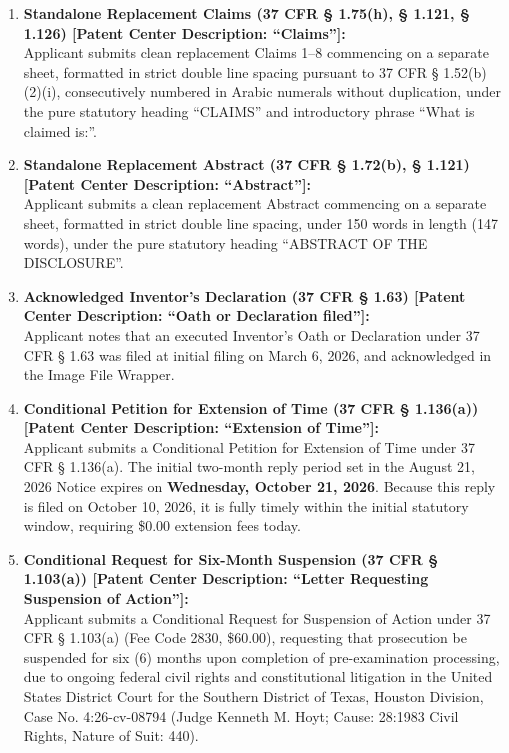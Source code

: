 \documentclass[11pt,letterpaper]{article}
\begin{document}
\begin{enumerate}[leftmargin=*]
    \item \textbf{Standalone Replacement Claims (37 CFR \S{} 1.75(h), \S{} 1.121, \S{} 1.126) [Patent Center Description: ``Claims'']:} \\
    Applicant submits clean replacement Claims 1--8 commencing on a separate sheet, formatted in strict double line spacing pursuant to 37 CFR \S{} 1.52(b)(2)(i), consecutively numbered in Arabic numerals without duplication, under the pure statutory heading ``CLAIMS'' and introductory phrase ``What is claimed is:''.

    \item \textbf{Standalone Replacement Abstract (37 CFR \S{} 1.72(b), \S{} 1.121) [Patent Center Description: ``Abstract'']:} \\
    Applicant submits a clean replacement Abstract commencing on a separate sheet, formatted in strict double line spacing, under 150 words in length (147 words), under the pure statutory heading ``ABSTRACT OF THE DISCLOSURE''.

    \item \textbf{Acknowledged Inventor's Declaration (37 CFR \S{} 1.63) [Patent Center Description: ``Oath or Declaration filed'']:} \\
    Applicant notes that an executed Inventor's Oath or Declaration under 37 CFR \S{} 1.63 was filed at initial filing on March 6, 2026, and acknowledged in the Image File Wrapper.

    \item \textbf{Conditional Petition for Extension of Time (37 CFR \S{} 1.136(a)) [Patent Center Description: ``Extension of Time'']:} \\
    Applicant submits a Conditional Petition for Extension of Time under 37 CFR \S{} 1.136(a). The initial two-month reply period set in the August 21, 2026 Notice expires on \textbf{Wednesday, October 21, 2026}. Because this reply is filed on October 10, 2026, it is fully timely within the initial statutory window, requiring \$0.00 extension fees today.

    \item \textbf{Conditional Request for Six-Month Suspension (37 CFR \S{} 1.103(a)) [Patent Center Description: ``Letter Requesting Suspension of Action'']:} \\
    Applicant submits a Conditional Request for Suspension of Action under 37 CFR \S{} 1.103(a) (Fee Code 2830, \$60.00), requesting that prosecution be suspended for six (6) months upon completion of pre-examination processing, due to ongoing federal civil rights and constitutional litigation in the United States District Court for the Southern District of Texas, Houston Division, Case No. 4:26-cv-08794 (Judge Kenneth M. Hoyt; Cause: 28:1983 Civil Rights, Nature of Suit: 440).
\end{enumerate}
\end{document}
